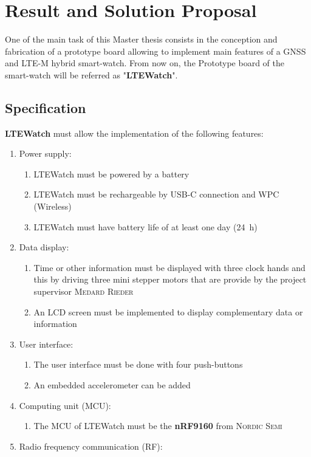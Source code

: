 \documentclass[report.tex]{subfiles}
\begin{document}
\chapter{Result and Solution Proposal}

One of the main task of this Master thesis consists in the conception and fabrication of a prototype board allowing to implement main features of a GNSS and LTE-M hybrid smart-watch. From now on, the Prototype board of the smart-watch will be referred as "\textbf{LTEWatch}".

\section{Specification} \label{sec:specification}
\textbf{LTEWatch} must allow the implementation of the following features:
\begin{enumerate}
\item Power supply:
\begin{enumerate}
	\item LTEWatch must be powered by a battery
	\item LTEWatch must be rechargeable by USB-C connection and WPC (Wireless)
	\item LTEWatch must have battery life of at least one day (\SI{24}{\hour})
\end{enumerate}
\item Data display:
\begin{enumerate}
	\item Time or other information must be displayed with three clock hands and this by driving three mini stepper motors that are provide by the project supervisor \textsc{Medard Rieder}
	\item An LCD screen must be implemented to display complementary data or information
\end{enumerate}
\item User interface:
\begin{enumerate}
	\item The user interface must be done with four push-buttons
	\item An embedded accelerometer can be added
\end{enumerate}
\item Computing unit (MCU):
\begin{enumerate}
	\item The MCU of LTEWatch must be the \textbf{nRF9160} from \textsc{Nordic Semi}	
\end{enumerate}
\item Radio frequency communication (RF):

\end{enumerate}
\end{document}
